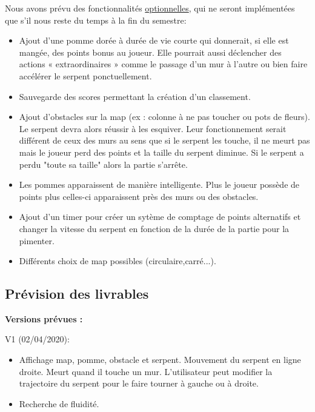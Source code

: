         Nous avons prévu des fonctionnalités \underline{optionnelles}, qui ne seront implémentées que s'il nous reste du temps à la fin du semestre:
            \begin{itemize}
            
                \item Ajout d’une pomme dorée à durée de vie courte qui 
                donnerait, si elle est mangée, des points bonus au joueur. Elle pourrait aussi déclencher des actions « extraordinaires » comme le passage d’un mur à l’autre ou bien faire accélérer le serpent ponctuellement. 
                \item Sauvegarde des scores permettant la création d'un 
                classement.
                \item Ajout d’obstacles sur la map (ex : colonne à ne pas 
                toucher ou pots de fleurs). Le serpent devra alors réussir à les esquiver. Leur fonctionnement serait différent de ceux des murs au sens que si le serpent les touche, il ne meurt pas mais le joueur perd des points et la taille du serpent diminue. Si le serpent a perdu "toute sa taille" alors la partie s'arrête. 
                \item Les pommes apparaissent de manière intelligente. Plus le joueur possède de    points plus celles-ci apparaissent près des murs ou des obstacles. 
                \item Ajout d'un timer pour créer un sytème de comptage de points alternatifs et changer la vitesse du serpent en fonction de la durée de la partie pour la pimenter.
                \item Différents choix de map possibles (circulaire,carré...).
               
            \end{itemize}
            

    \subsection{Prévision des livrables}
        
        \textbf{Versions prévues :}
        
        \vspace{0.5 cm}
        V1 (02/04/2020):
        \begin{itemize}
        
            \item Affichage map, pomme, obstacle et serpent. Mouvement du 
                  serpent en ligne droite. Meurt quand il touche un mur. L'utilisateur peut 
                  modifier la trajectoire du serpent pour le faire tourner à gauche ou à droite.
            \item Recherche de fluidité.
            
        \end{itemize}
        
